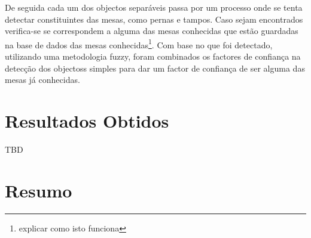 De seguida cada um dos objectos separáveis passa por um processo onde se tenta 
detectar constituintes das mesas, como pernas e tampos. Caso sejam encontrados 
verifica-se se correspondem a alguma das mesas conhecidas que estão guardadas
na base de dados das mesas conhecidas\footnote{explicar como isto funciona}.
Com base no que foi detectado, utilizando uma metodologia fuzzy, foram combinados
os factores de confiança na detecção dos objectoss simples para dar um factor de 
confiança de ser alguma das mesas já conhecidas.


\section {Resultados Obtidos}

TBD

\section{Resumo}


